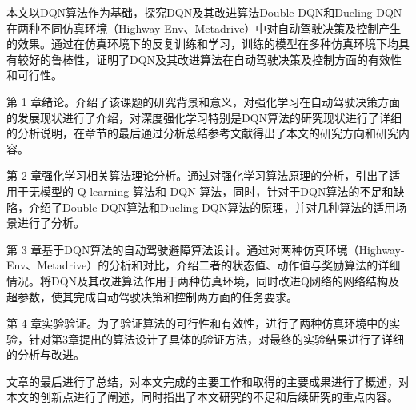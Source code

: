 本文以DQN算法作为基础，探究DQN及其改进算法Double DQN和Dueling DQN在两种不同仿真环境（Highway-Env、Metadrive）中对自动驾驶决策及控制产生的效果。通过在仿真环境下的反复训练和学习，训练的模型在多种仿真环境下均具有较好的鲁棒性，证明了DQN及其改进算法在自动驾驶决策及控制方面的有效性和可行性。

第 1 章绪论。介绍了该课题的研究背景和意义，对强化学习在自动驾驶决策方面的发展现状进行了介绍，对深度强化学习特别是DQN算法的研究现状进行了详细的分析说明，在章节的最后通过分析总结参考文献得出了本文的研究方向和研究内容。

第 2 章强化学习相关算法理论分析。通过对强化学习算法原理的分析，引出了适用于无模型的 Q-learning 算法和 DQN 算法，同时，针对于DQN算法的不足和缺陷，介绍了Double DQN算法和Dueling DQN算法的原理，并对几种算法的适用场景进行了分析。

第 3 章基于DQN算法的自动驾驶避障算法设计。通过对两种仿真环境（Highway-Env、Metadrive）的分析和对比，介绍二者的状态值、动作值与奖励算法的详细情况。将DQN及其改进算法作用于两种仿真环境，同时改进Q网络的网络结构及超参数，使其完成自动驾驶决策和控制两方面的任务要求。

第 4 章实验验证。为了验证算法的可行性和有效性，进行了两种仿真环境中的实验，针对第3章提出的算法设计了具体的验证方法，对最终的实验结果进行了详细的分析与改进。

文章的最后进行了总结，对本文完成的主要工作和取得的主要成果进行了概述，对本文的创新点进行了阐述，同时指出了本文研究的不足和后续研究的重点内容。

